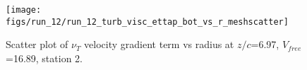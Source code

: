 \begin{figure}[H]
\centering
\texttt{[image: figs/run\_12/run\_12\_turb\_visc\_ettap\_bot\_vs\_r\_meshscatter]}
\caption{Scatter plot of $\nu_T$ velocity gradient term vs radius at $z/c$=6.97, $V_{free}$=16.89, station 2.}
\label{fig:run_12_turb_visc_ettap_bot_vs_r_meshscatter}
\end{figure}


